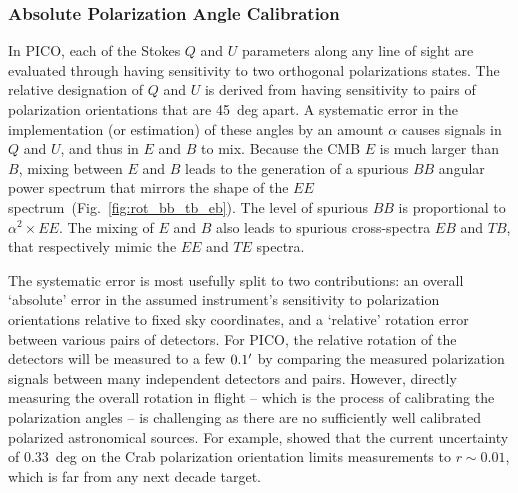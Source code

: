 \documentclass[PICOReport.tex]{subfiles}
\begin{document}


\subsubsection{Absolute Polarization Angle Calibration}
\label{sec:angle}

In PICO, each of the Stokes $Q$ and $U$ parameters along any line of sight are evaluated through having sensitivity to two orthogonal polarizations states. The relative designation of $Q$ and $U$ is derived from having sensitivity to pairs of polarization orientations that are 45~deg apart. A systematic error in the implementation (or estimation) of these angles by an amount $\alpha$ causes signals in $Q$ and $U$, and thus in $E$ and $B$ to mix. Because the CMB $E$ is much larger than $B$, mixing between $E$ and $B$ leads to the generation of a spurious $BB$ angular power spectrum that mirrors the shape of the $EE$ spectrum~(Fig.~\ref{fig:rot_bb_tb_eb}). The level of spurious $BB$ is proportional to $\alpha^{2} \times EE$.   The mixing of $E$ and $B$ also leads to spurious cross-spectra $EB$ and $TB$, that respectively mimic the $EE$ and $TE$ spectra. 

The systematic error is most usefully split to two contributions: an overall `absolute' error in the assumed instrument's sensitivity to polarization orientations relative to fixed sky coordinates, and a `relative' rotation error between various pairs of detectors. For PICO, the relative rotation of the detectors will be measured to a few $0.1'$ by comparing the measured polarization signals between many independent detectors and pairs. However, directly measuring the overall rotation in flight -- which is the process of calibrating the polarization angles --  is challenging as there are no sufficiently well calibrated polarized astronomical sources. For example, \citet{Aumont+2018} showed that the current uncertainty of $0.33$~deg on the Crab polarization orientation limits measurements to $r \sim 0.01$, which is far from any next decade target. 
\end{document}
